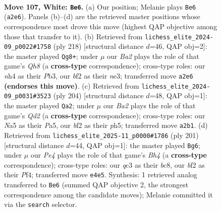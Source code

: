 \documentclass[11pt]{article}
\begin{document}
\begin{figure}[p]\centering
\begin{subfigure}{0.46\textwidth}\centering
\resizebox{\linewidth}{!}{%
\newchessgame
\chessboard[
  setfen={8/6k1/n7/N7/Pp2P2n/2q5/B4b1p/3K4 w - - 6 107},
  showmover=false,
  pgfstyle=straightmove, color=movearrow, markmove={a2-e6}
]}
\caption{}
\end{subfigure}\hfill
\begin{subfigure}{0.46\textwidth}\centering
\resizebox{\linewidth}{!}{%
\newchessgame
\chessboard[
  setfen={7Q/1p6/p7/P1K5/8/1P2n3/2P3k1/5q2 w - - 0 110},
  showmover=false,
  pgfstyle=straightmove, color=movearrow, markmove={h8-g8}
]}
\caption{}
\end{subfigure}
\\[4pt]
\begin{subfigure}{0.46\textwidth}\centering
\resizebox{\linewidth}{!}{%
\newchessgame
\chessboard[
  setfen={8/4k3/2q3p1/Pp5p/7P/6P1/3Q4/6K1 w - - 32 103},
  showmover=false,
  pgfstyle=straightmove, color=movearrow, markmove={d2-a2}
]}
\caption{}
\end{subfigure}\hfill
\begin{subfigure}{0.46\textwidth}\centering
\resizebox{\linewidth}{!}{%
\newchessgame
\chessboard[
  setfen={2B5/8/3N4/7b/3k1p1p/7P/r7/6K1 b - - 11 101},
  showmover=false,
  pgfstyle=straightmove, color=movearrow, markmove={h5-g6}
]}
\caption{}
\end{subfigure}
\caption{\textbf{Move 107, White: \texttt{Be6}.} (a) Our position; Melanie plays \texttt{Be6} (\texttt{a2e6}). Panels (b)--(d) are the retrieved master positions whose correspondence most drove this move (highest QAP objective among those that transfer to it). (b) Retrieved from \texttt{lichess\_elite\_2024-09\_p0022\#1758} (ply 218) [structural distance $d$=46, QAP obj=2]: the master played \texttt{Qg8+}; under $\mu$ our \emph{Ba2} plays the role of that game's \emph{Qh8} (a \textbf{cross-type} correspondence); cross-type roles: our \emph{n}h4 as their \emph{P}b3, our \emph{b}f2 as their \emph{n}e3; transferred move \texttt{a2e6} \textbf{(endorses this move)}. (c) Retrieved from \texttt{lichess\_elite\_2024-09\_p0031\#3523} (ply 204) [structural distance $d$=48, QAP obj=1]: the master played \texttt{Qa2}; under $\mu$ our \emph{Ba2} plays the role of that game's \emph{Qd2} (a \textbf{cross-type} correspondence); cross-type roles: our \emph{N}a5 as their \emph{P}a5, our \emph{b}f2 as their \emph{p}h5; transferred move \texttt{a2b1}. (d) Retrieved from \texttt{lichess\_elite\_2025-11\_p0000\#1786} (ply 201) [structural distance $d$=44, QAP obj=1]: the master played \texttt{Bg6}; under $\mu$ our \emph{Pe4} plays the role of that game's \emph{Bh4} (a \textbf{cross-type} correspondence); cross-type roles: our \emph{q}c3 as their \emph{b}c8, our \emph{b}f2 as their \emph{P}f4; transferred move \texttt{e4e5}. Synthesis: 1 retrieved analog transferred to \texttt{Be6} (summed QAP objective 2, the strongest correspondence among the candidate moves); Melanie committed it via the \texttt{search} selector.}
\label{fig:thought-m212}
\end{figure}
\end{document}
